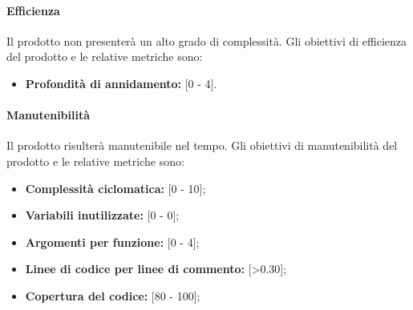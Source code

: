 \paragraph{Efficienza} Il prodotto non presenterà un alto grado di complessità. 
Gli obiettivi di efficienza del prodotto e le relative metriche sono:
\begin{itemize}
\item \textbf{Profondità di annidamento: }[0 - 4].
\end{itemize}

\paragraph{Manutenibilità} Il prodotto risulterà manutenibile nel tempo. 
Gli obiettivi di manutenibilità del prodotto e le relative metriche sono:
\begin{itemize}
\item \textbf{Complessità ciclomatica: }[0 - 10];
\item \textbf{Variabili inutilizzate: }[0 - 0];
\item \textbf{Argomenti per funzione: }[0 - 4];
\item \textbf{Linee di codice per linee di commento: }[>0.30];
\item \textbf{Copertura del codice: }[80 - 100];
\end{itemize}
